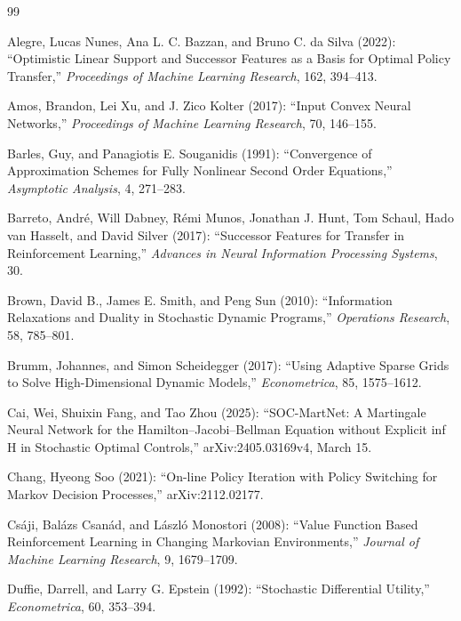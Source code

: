 \begin{thebibliography}{99}

Alegre, Lucas Nunes, Ana L. C. Bazzan, and Bruno C. da Silva (2022): ``Optimistic Linear Support and Successor Features as a Basis for Optimal Policy Transfer,'' \emph{Proceedings of Machine Learning Research}, 162, 394--413.

Amos, Brandon, Lei Xu, and J. Zico Kolter (2017): ``Input Convex Neural Networks,'' \emph{Proceedings of Machine Learning Research}, 70, 146--155.

Barles, Guy, and Panagiotis E. Souganidis (1991): ``Convergence of Approximation Schemes for Fully Nonlinear Second Order Equations,'' \emph{Asymptotic Analysis}, 4, 271--283.

Barreto, Andr\'e, Will Dabney, R\'emi Munos, Jonathan J. Hunt, Tom Schaul, Hado van Hasselt, and David Silver (2017): ``Successor Features for Transfer in Reinforcement Learning,'' \emph{Advances in Neural Information Processing Systems}, 30.

Brown, David B., James E. Smith, and Peng Sun (2010): ``Information Relaxations and Duality in Stochastic Dynamic Programs,'' \emph{Operations Research}, 58, 785--801.

Brumm, Johannes, and Simon Scheidegger (2017): ``Using Adaptive Sparse Grids to Solve High-Dimensional Dynamic Models,'' \emph{Econometrica}, 85, 1575--1612.

Cai, Wei, Shuixin Fang, and Tao Zhou (2025): ``SOC-MartNet: A Martingale Neural Network for the Hamilton--Jacobi--Bellman Equation without Explicit inf H in Stochastic Optimal Controls,'' arXiv:2405.03169v4, March 15.

Chang, Hyeong Soo (2021): ``On-line Policy Iteration with Policy Switching for Markov Decision Processes,'' arXiv:2112.02177.

Cs\'aji, Bal\'azs Csan\'ad, and L\'aszl\'o Monostori (2008): ``Value Function Based Reinforcement Learning in Changing Markovian Environments,'' \emph{Journal of Machine Learning Research}, 9, 1679--1709.

Duffie, Darrell, and Larry G. Epstein (1992): ``Stochastic Differential Utility,'' \emph{Econometrica}, 60, 353--394.


\end{thebibliography}
